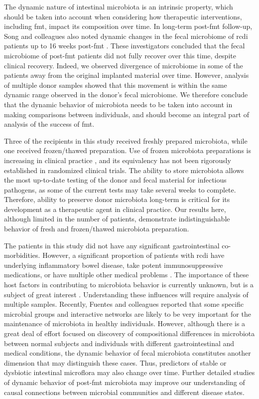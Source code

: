 The dynamic nature of intestinal microbiota is an intrinsic property, which should be taken into account when considering how therapeutic interventions, including \gls{fmt}, impact its composition over time. In long-term post-\gls{fmt} follow-up, Song and colleagues also noted dynamic changes in the fecal microbiome of \gls{rcdi} patients up to 16 weeks post-\gls{fmt} \cite{RN35moviefmt}. These investigators concluded that the fecal microbiome of post-\gls{fmt} patients did not fully recover over this time, despite clinical recovery. Indeed, we observed divergence of microbiome in some of the patients away from the original implanted material over time. However, analysis of multiple donor samples showed that this movement is within the same dynamic range observed in the donor's fecal microbiome. We therefore conclude that the dynamic behavior of microbiota needs to be taken into account in making comparisons between individuals, and should become an integral part of analysis of the success of \gls{fmt}.

Three of the recipients in this study received freshly prepared microbiota, while one received frozen/thawed preparation. Use of frozen microbiota preparations is increasing in clinical practice \cite{RN26}, and its equivalency has not been rigorously established in randomized clinical trials. The ability to store microbiota allows the most up-to-date testing of the donor and fecal material for infectious pathogens, as some of the current tests may take several weeks to complete. Therefore, ability to preserve donor microbiota long-term is critical for its development as a therapeutic agent in clinical practice. Our results here, although limited in the number of patients, demonstrate indistinguishable behavior of fresh and frozen/thawed microbiota preparation.

The patients in this study did not have any significant gastrointestinal co-morbidities. However, a significant proportion of patients with \gls{rcdi} have underlying inflammatory bowel disease, take potent immunosuppressive medications, or have multiple other medical problems \cite{RN45, RN85}. The importance of these host factors in contributing to microbiota behavior is currently unknown, but is a subject of great interest \cite{RN154}. Understanding these influences will require analysis of multiple samples. Recently, Fuentes and colleagues \cite{RN53moviefmt} reported that some specific microbial groups and interactive networks are likely to be very important for the maintenance of microbiota in healthy individuals. However, although there is a great deal of effort focused on discovery of compositional differences in microbiota between normal subjects and individuals with different gastrointestinal and medical conditions, the dynamic behavior of fecal microbiota constitutes another dimension that may distinguish these cases. Thus, predictors of stable or dysbiotic intestinal microflora may also change over time. Further detailed studies of dynamic behavior of post-\gls{fmt} microbiota may improve our understanding of causal connections between microbial communities and different disease states.   

